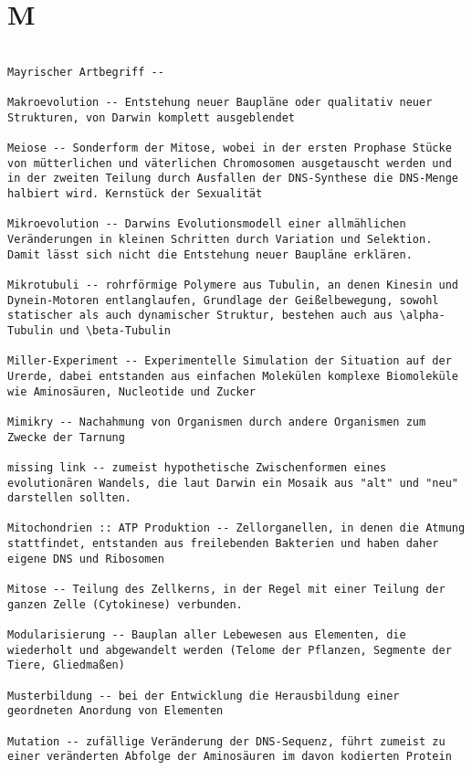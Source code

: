 \documentclass{article}
\begin{document}
\section{M}
\begin{verbatim}

Mayrischer Artbegriff -- 

Makroevolution -- Entstehung neuer Baupläne oder qualitativ neuer Strukturen, von Darwin komplett ausgeblendet

Meiose -- Sonderform der Mitose, wobei in der ersten Prophase Stücke von mütterlichen und väterlichen Chromosomen ausgetauscht werden und in der zweiten Teilung durch Ausfallen der DNS-Synthese die DNS-Menge halbiert wird. Kernstück der Sexualität

Mikroevolution -- Darwins Evolutionsmodell einer allmählichen Veränderungen in kleinen Schritten durch Variation und Selektion. Damit lässt sich nicht die Entstehung neuer Baupläne erklären.

Mikrotubuli -- rohrförmige Polymere aus Tubulin, an denen Kinesin und Dynein-Motoren entlanglaufen, Grundlage der Geißelbewegung, sowohl statischer als auch dynamischer Struktur, bestehen auch aus \alpha-Tubulin und \beta-Tubulin

Miller-Experiment -- Experimentelle Simulation der Situation auf der Urerde, dabei entstanden aus einfachen Molekülen komplexe Biomoleküle wie Aminosäuren, Nucleotide und Zucker

Mimikry -- Nachahmung von Organismen durch andere Organismen zum Zwecke der Tarnung

missing link -- zumeist hypothetische Zwischenformen eines evolutionären Wandels, die laut Darwin ein Mosaik aus "alt" und "neu" darstellen sollten. 

Mitochondrien :: ATP Produktion -- Zellorganellen, in denen die Atmung stattfindet, entstanden aus freilebenden Bakterien und haben daher eigene DNS und Ribosomen

Mitose -- Teilung des Zellkerns, in der Regel mit einer Teilung der ganzen Zelle (Cytokinese) verbunden.

Modularisierung -- Bauplan aller Lebewesen aus Elementen, die wiederholt und abgewandelt werden (Telome der Pflanzen, Segmente der Tiere, Gliedmaßen)

Musterbildung -- bei der Entwicklung die Herausbildung einer geordneten Anordung von Elementen

Mutation -- zufällige Veränderung der DNS-Sequenz, führt zumeist zu einer veränderten Abfolge der Aminosäuren im davon kodierten Protein


\end{verbatim}
\end{document}
